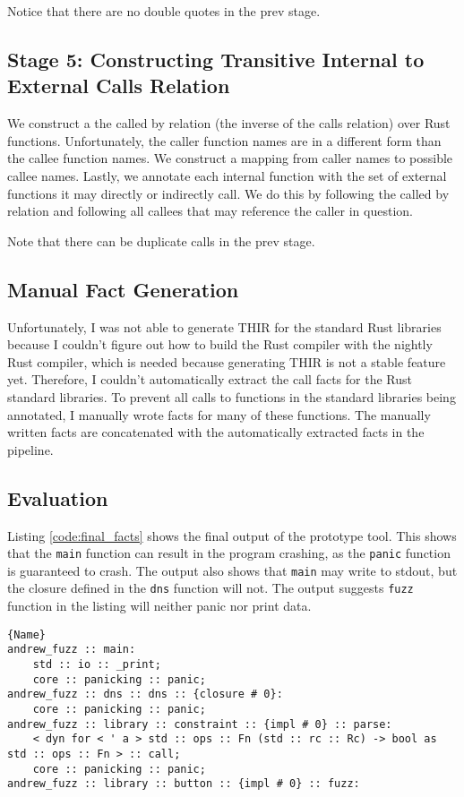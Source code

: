 \documentclass[11pt]{article}
\begin{document}
Notice that there are no double quotes in the prev stage.

\subsection{Stage 5: Constructing Transitive Internal to External Calls Relation}

We construct a the called by relation (the inverse of the calls relation) over Rust functions.
Unfortunately, the caller function names are in a different form than the callee function names.
We construct a mapping from caller names to possible callee names.
Lastly, we annotate each internal function with the set of external functions it may directly or indirectly call.
We do this by following the called by relation and following all callees that may reference the caller in question.

Note that there can be duplicate calls in the prev stage.

\subsection{Manual Fact Generation}

Unfortunately, I was not able to generate THIR for the standard Rust libraries because I couldn't figure out how to build the Rust compiler with the nightly Rust compiler, which is needed because generating THIR is not a stable feature yet.
Therefore, I couldn't automatically extract the call facts for the Rust standard libraries.
To prevent all calls to functions in the standard libraries being annotated, I manually wrote facts for many of these functions.
The manually written facts are concatenated with the automatically extracted facts in the pipeline.

\subsection{Evaluation}

Listing \ref{code:final_facts} shows the final output of the prototype tool.
This shows that the \lstinline{main} function can result in the program crashing, as the \lstinline{panic} function is guaranteed to crash.
The output also shows that \lstinline{main} may write to stdout, but the closure defined in the \lstinline{dns} function will not.
The output suggests \lstinline{fuzz} function in the listing will neither panic nor print data.

\begin{lstlisting}[caption=External Function Annotions, label=code:final_facts]{Name}
andrew_fuzz :: main:
	std :: io :: _print;
	core :: panicking :: panic;
andrew_fuzz :: dns :: dns :: {closure # 0}:
	core :: panicking :: panic;
andrew_fuzz :: library :: constraint :: {impl # 0} :: parse:
	< dyn for < ' a > std :: ops :: Fn (std :: rc :: Rc) -> bool as std :: ops :: Fn > :: call;
	core :: panicking :: panic;
andrew_fuzz :: library :: button :: {impl # 0} :: fuzz:
\end{lstlisting}
\end{document}
